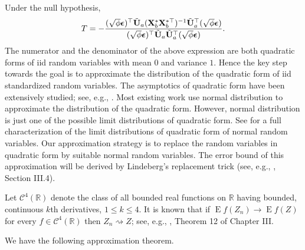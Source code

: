 \documentclass[11pt]{article}
\DeclareMathOperator{\myE}{E}
\theoremstyle{plain}
\theoremstyle{definition}
\theoremstyle{remark}
\begin{document}
Under the null hypothesis,
\begin{equation*}
    T=-\frac{ (\sqrt \phi \boldsymbol{\epsilon})^\top \tilde {\mathbf{U}}_a (\mathbf{X}_b^* \mathbf{X}_b^{*\top})^{-1} \tilde {\mathbf{U}}_a^\top (\sqrt \phi \boldsymbol{\epsilon})}{ (\sqrt \phi \boldsymbol{\epsilon})^\top \tilde {\mathbf{U}}_a  \tilde {\mathbf{U}}_a^\top (\sqrt \phi \boldsymbol{\epsilon})}.
\end{equation*}
The numerator and the denominator of the above expression are both quadratic forms of iid random variables with mean $0$ and variance $1$.
Hence the key step towards the goal is to approximate the distribution of the quadratic form of iid standardized random variables.
The asymptotics of quadratic form have been extensively studied; see, e.g., \cite{jiang1996reml,Bentkus1996Optimal,Goetze2002,Dicker2015Flexible,Bai2017}.
Most existing work use normal distribution to approximate the distribution of the quadratic form.
However, normal distribution is just one of the possible limit distributions of quadratic form.
See \cite{Sevast1961A} for a full characterization of the limit distributions of quadratic form of normal random variables.
Our approximation strategy is to replace the random variables in quadratic form by suitable normal random variables.
The error bound of this approximation will be derived by Lindeberg's replacement trick (see, e.g., \cite{pollard1984convergence}, Section III.4).

Let $\mathscr C^4(\mathbb R)$ denote the class of all bounded real functions on $\mathbb R$ having bounded, continuous $k$th derivatives, $1\leq k\leq 4$.
It is known that if $\myE f(Z_n)\to \myE f(Z)$ for every $f\in \mathscr C^4 (\mathbb R)$ then $Z_n \rightsquigarrow Z$; see, e.g., \cite{pollard1984convergence}, Theorem 12 of Chapter III.




We have the following approximation theorem.
\end{document}
